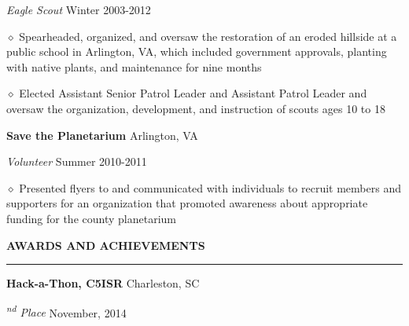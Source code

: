 \documentclass[executivepaper]{extarticle}
\begin{document}
\begin{center}
{\begin{minipage}{7.0in}
{\noindent \textit{\fontsize{12}{8}\selectfont Eagle Scout}} {\hfill \fontsize{10}{8}\selectfont Winter 2003-2012}

\vspace{0.25mm}

{\noindent $\diamond$ {\fontsize{12}{8}\selectfont Spearheaded, organized, and oversaw the restoration of an eroded hillside at a public school in Arlington, VA, which included government
approvals, planting with native plants, and maintenance for nine months}}

{\noindent $\diamond$ {\fontsize{12}{8}\selectfont Elected Assistant Senior Patrol Leader and Assistant Patrol Leader and oversaw the organization, development, and instruction of scouts ages 10 to 18}}

\vspace{2mm}

{\noindent \textbf{\fontsize{12}{8}\selectfont Save the Planetarium}} {\hfill \fontsize{10}{8}\selectfont Arlington, VA}

\vspace{0.25mm}

{\noindent \textit{\fontsize{12}{8}\selectfont Volunteer}} {\hfill \fontsize{10}{8}\selectfont Summer 2010-2011}

\vspace{0.25mm}

{\noindent $\diamond$ {\fontsize{12}{8}\selectfont Presented flyers to and communicated with individuals to recruit members and supporters for an organization that promoted awareness about appropriate funding
for the county planetarium}}

\vspace{3mm}


{\noindent \textbf{\fontsize{12}{9}\selectfont AWARDS AND ACHIEVEMENTS}}

\vspace{-3mm}

\noindent \rule{\textwidth}{0.5pt}

\vspace{1mm}

{\noindent \textbf{\fontsize{12}{8}\selectfont Hack-a-Thon, C5ISR}} {\hfill \fontsize{10}{8}\selectfont Charleston, SC}

{\noindent \textit{\fontsize{12}{8}\textsuperscript{nd} Place}} {\hfill \fontsize{10}{8}\selectfont November, 2014}


\end{minipage}}
\end{center}
\end{document}
